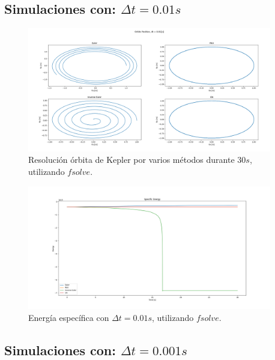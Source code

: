 \documentclass[12pt,a4paper]{article}
\begin{document}
\subsection{Simulaciones con: $\Delta t = 0.01 s$}

\begin{figure}[H] 
	\centering
	\includegraphics[width=0.95\textwidth]{FIGURES/dt0.01_fsolve_pos.png}
	\caption{Resolución órbita de Kepler por varios métodos durante 30$s$, utilizando $fsolve$.}
\end{figure}
\begin{figure}[H] 
	\centering
	\includegraphics[width=0.95\textwidth]{FIGURES/dt0.01_fsolve_energy.png}
	\caption{Energía específica con $\Delta t = 0.01 s$, utilizando $fsolve$.}
\end{figure}



\subsection{Simulaciones con: $\Delta t = 0.001 s$}
\end{document}
